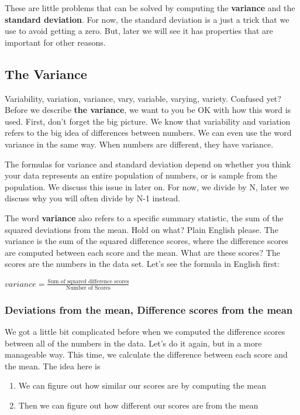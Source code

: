 \documentclass[
]{book}
\providecommand{\tightlist}{%
  \setlength{\itemsep}{0pt}\setlength{\parskip}{0pt}}
\begin{document}
These are little problems that can be solved by computing the \textbf{variance} and the \textbf{standard deviation}. For now, the standard deviation is a just a trick that we use to avoid getting a zero. But, later we will see it has properties that are important for other reasons.

\subsection{The Variance}\label{the-variance}

Variability, variation, variance, vary, variable, varying, variety. Confused yet? Before we describe \textbf{the variance}, we want to you be OK with how this word is used. First, don't forget the big picture. We know that variability and variation refers to the big idea of differences between numbers. We can even use the word variance in the same way. When numbers are different, they have variance.

The formulas for variance and standard deviation depend on whether you think your data represents an entire population of numbers, or is sample from the population. We discuss this issue in later on. For now, we divide by N, later we discuss why you will often divide by N-1 instead.

The word \textbf{variance} also refers to a specific summary statistic, the sum of the squared deviations from the mean. Hold on what? Plain English please. The variance is the sum of the squared difference scores, where the difference scores are computed between each score and the mean. What are these scores? The scores are the numbers in the data set. Let's see the formula in English first:

\(variance = \frac{\text{Sum of squared difference scores}}{\text{Number of Scores}}\)

\subsubsection{Deviations from the mean, Difference scores from the mean}\label{deviations-from-the-mean-difference-scores-from-the-mean}

We got a little bit complicated before when we computed the difference scores between all of the numbers in the data. Let's do it again, but in a more manageable way. This time, we calculate the difference between each score and the mean. The idea here is

\begin{enumerate}
\def\labelenumi{\arabic{enumi}.}
\tightlist
\item
  We can figure out how similar our scores are by computing the mean
\item
  Then we can figure out how different our scores are from the mean
\end{enumerate}
\end{document}
